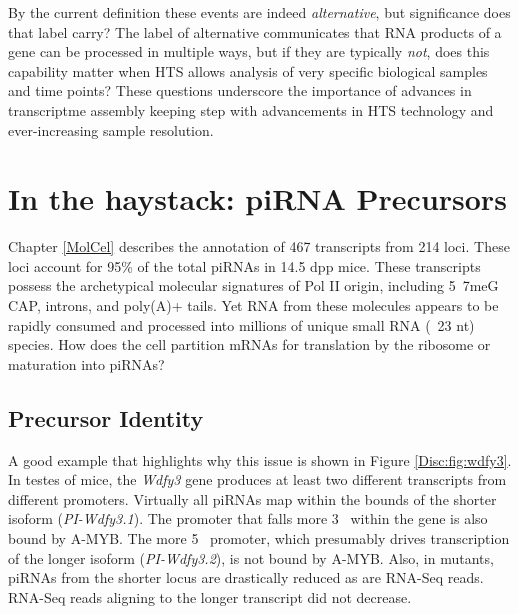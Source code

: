     By the current definition these events are indeed \textit{alternative}, but significance does that label carry? The label of alternative communicates that RNA products of a gene can be processed in multiple ways, but if they are typically \textit{not}, does this capability matter when HTS allows analysis of very specific biological samples and time points? These questions underscore the importance of advances in transcriptme assembly keeping step with advancements in HTS technology and ever-increasing sample resolution.

\section{In the haystack: piRNA Precursors}
  \label{Disc:sec:piRNA precursors}

  Chapter \ref{MolCel} describes the annotation of 467 transcripts from 214 loci. These loci account for 95\% of the total piRNAs in 14.5 dpp mice. These transcripts possess the archetypical molecular signatures of Pol II origin, including 5\textprime~7meG CAP, introns, and poly(A)+ tails. Yet RNA from these molecules appears to be rapidly consumed and processed into millions of unique small RNA (~23 nt) species. How does the cell partition mRNAs for translation by the ribosome or maturation into piRNAs?

  \subsection{Precursor Identity}
    \label{Disc:subsec:How are precursors generated}

    A good example that highlights why this issue is shown in Figure \ref{Disc:fig:wdfy3}. In testes of mice, the \textit{Wdfy3} gene produces at least two different transcripts from different promoters. Virtually all piRNAs map within the bounds of the shorter isoform (\textit{PI-Wdfy3.1}). The promoter that falls more 3\textprime~ within the gene is also bound by A-MYB. The more 5\textprime~ promoter, which presumably drives transcription of the longer isoform (\textit{PI-Wdfy3.2}), is not bound by A-MYB. Also, in \amyb{} mutants, piRNAs from the shorter locus are drastically reduced as are RNA-Seq reads. RNA-Seq reads aligning to the longer transcript did not decrease.

